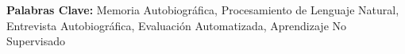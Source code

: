 
\textbf{Palabras Clave:} Memoria Autobiográfica, Procesamiento de Lenguaje Natural, Entrevista Autobiográfica, Evaluación Automatizada, Aprendizaje No Supervisado
